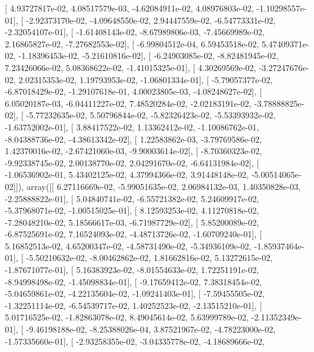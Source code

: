 \documentclass{article}
\begin{document}
       [  4.93727817e-02,   4.08517579e-03,  -4.62084911e-02,
          4.08976803e-02,  -1.10298557e-01],
       [ -2.92373170e-02,  -4.09648550e-02,   2.94447559e-02,
         -6.54773331e-02,  -2.32054107e-01],
       [ -1.61408143e-02,  -8.67989806e-03,  -7.45669989e-02,
          2.16865827e-02,  -7.27682553e-02],
       [ -6.99804512e-04,   6.59453518e-02,   5.47409371e-02,
         -1.18396453e-02,  -5.21610816e-02],
       [ -6.24903085e-02,  -8.82481945e-02,   7.23426066e-02,
          5.08368622e-02,  -1.41015325e-01],
       [  4.30269569e-02,  -3.27247676e-02,   2.02315353e-02,
          1.19793953e-02,  -1.06801334e-01],
       [ -5.79057377e-02,  -6.87018429e-02,  -1.29107618e-01,
          4.00023805e-03,  -4.08248627e-02],
       [  6.05020187e-03,  -6.04411227e-02,   7.48520284e-02,
         -2.02183191e-02,  -3.78888825e-02],
       [ -5.77232635e-02,   5.50796844e-02,  -5.82326423e-02,
         -5.53393932e-02,  -1.63752002e-01],
       [  3.88417522e-02,   1.13362412e-02,  -1.10086762e-01,
         -8.04388736e-02,  -4.38613342e-02],
       [  1.22583862e-03,  -3.79769586e-02,   1.42370016e-02,
         -2.67421060e-03,  -9.90003614e-02],
       [ -8.70360323e-02,  -9.92338745e-02,   2.00138770e-02,
          2.04291670e-02,  -6.64131984e-02],
       [ -1.06536902e-01,   5.43402125e-02,   4.37994366e-02,
          3.91448148e-02,  -5.00514065e-02]]), array([[  6.27116669e-02,  -5.99051635e-02,   2.06984132e-03,
          1.40350828e-03,  -2.25888822e-01],
       [  5.04840741e-02,  -6.55721382e-02,   5.24609917e-02,
         -5.37968071e-02,  -1.00515025e-01],
       [  8.12593253e-02,   4.11270818e-02,  -7.28048210e-02,
          5.18566617e-03,  -6.71987729e-02],
       [  5.85200089e-02,  -6.87525691e-02,   7.16524093e-02,
         -4.48713726e-02,  -1.60709240e-01],
       [  5.16852513e-02,   4.65200347e-02,  -4.58731490e-02,
         -5.34936109e-02,  -1.85937464e-01],
       [ -5.50210632e-02,  -8.00462862e-02,   1.81662816e-02,
          5.13272615e-02,  -1.87671077e-01],
       [  5.16383923e-02,  -8.01554633e-02,   1.72251191e-02,
         -8.94998498e-02,  -1.45098834e-01],
       [ -9.17659412e-02,   7.38318454e-02,  -5.04659861e-02,
         -4.22135604e-02,  -1.09241403e-01],
       [ -7.59455505e-02,  -1.32251114e-02,  -6.54539717e-02,
          1.40252523e-02,  -2.13515210e-01],
       [  5.01716525e-02,  -1.82863078e-02,   8.49045614e-02,
          5.63999789e-02,  -2.11352349e-01],
       [ -9.46198188e-02,  -8.25388026e-04,   3.87521967e-02,
         -4.78223000e-02,  -1.57335660e-01],
       [ -2.93258355e-02,  -3.04335778e-02,  -4.18689666e-02,
\end{document}
